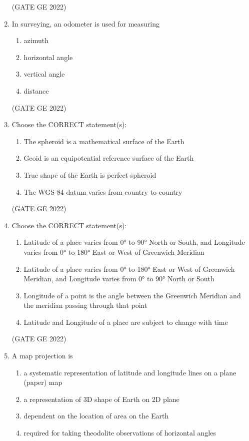 \documentclass[a4paper, 11pt]{article}
\begin{document}
\begin{enumerate}
\hfill (GATE GE 2022)

\item In surveying, an odometer is used for measuring
\begin{enumerate}
    \item azimuth
    \item horizontal angle
    \item vertical angle
    \item distance
\end{enumerate}

\hfill (GATE GE 2022)

\item Choose the CORRECT statement(s):
\begin{enumerate}
    \item The spheroid is a mathematical surface of the Earth
    \item Geoid is an equipotential reference surface of the Earth
    \item True shape of the Earth is perfect spheroid
    \item The WGS-84 datum varies from country to country
\end{enumerate}

\hfill (GATE GE 2022)

\item Choose the CORRECT statement(s):
\begin{enumerate}
    \item Latitude of a place varies from 0° to 90° North or South, and Longitude varies from 0° to 180° East or West of Greenwich Meridian
    \item Latitude of a place varies from 0° to 180° East or West of Greenwich Meridian, and Longitude varies from 0° to 90° North or South
    \item Longitude of a point is the angle between the Greenwich Meridian and the meridian passing through that point
    \item Latitude and Longitude of a place are subject to change with time
\end{enumerate}

\hfill (GATE GE 2022)

\item A map projection is
\begin{enumerate}
    \item a systematic representation of latitude and longitude lines on a plane (paper) map
    \item a representation of 3D shape of Earth on 2D plane
    \item dependent on the location of area on the Earth
    \item required for taking theodolite observations of horizontal angles
\end{enumerate}


\end{enumerate}
\end{document}
